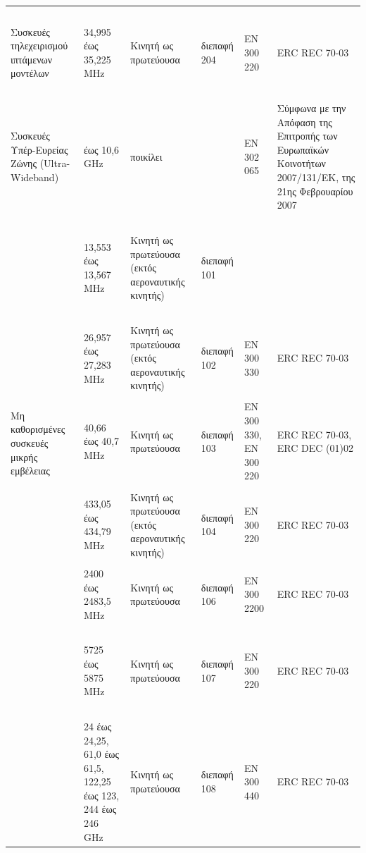 \documentclass[a4paper, 12pt, twoside]{report}
\begin{document}
{{{{{{\begin{landscape}
\begin{longtable} { m{3cm} m{2cm} m{4cm} m{1.5cm} m{2cm} m{4cm} }
					\hdashline
					~\\
					Συσκευές τηλεχειρισμού ιπτάμενων
μοντέλων & 34,995 έως 35,225 MHz & Κινητή ως πρωτεύουσα & διεπαφή 204 & EN 300 220 & ERC REC 70-03\\
					\hdashline
					~\\
					Συσκευές Υπέρ-Ευρείας Ζώνης (Ultra-Wideband) & έως 10,6 GHz & ποικίλει & & EN 302 065 & Σύμφωνα με την Απόφαση της Επιτροπής των Ευρωπαϊκών Κοινοτήτων 2007/131/EK, της 21ης Φεβρουαρίου 2007\\
					\hdashline
					~\\
					& 13,553 έως 13,567 MHz & Κινητή ως πρωτεύουσα (εκτός αεροναυτικής κινητής) & διεπαφή 101 & & \\
					\cline{2-6}
					~\\
				   	\multirow{6}{*}{\parbox{3cm}{Μη καθορισμένες συσκευές μικρής εμβέλειας}}  & 26,957 έως 27,283 MHz & Κινητή ως πρωτεύουσα (εκτός αεροναυτικής κινητής) & διεπαφή 102 & EN 300 330 & ERC REC 70-03\\
				   	\cline{2-6}
					~\\
				   	& 40,66 έως 40,7 MHz & Κινητή ως πρωτεύουσα & διεπαφή 103 & EN 300 330, ΕΝ 300 220 & ERC REC 70-03, ERC DEC (01)02\\
				   	\cline{2-6}
					~\\
				   	& 433,05 έως 434,79 MHz & Κινητή ως πρωτεύουσα (εκτός αεροναυτικής κινητής) & διεπαφή 104 & ΕΝ 300 220 & ERC REC 70-03\\
				   	\cline{2-6}
					~\\
				   	& 2400 έως 2483,5 MHz & Κινητή ως πρωτεύουσα & διεπαφή 106 & ΕΝ 300 2200 & ERC REC 70-03\\
				   	\cline{2-6}
					~\\
				   	& 5725 έως 5875 MHz & Κινητή ως πρωτεύουσα & διεπαφή 107 & ΕΝ 300 220 & ERC REC 70-03\\
				   	\cline{2-6}
					~\\
				   	& 24 έως 24,25, 61,0 έως 61,5, 122,25 έως 123, 244 έως 246 GHz & Κινητή ως πρωτεύουσα & διεπαφή 108 & EN 300 440 & ERC REC 70-03\\
					\hline
			\end{longtable}
			\end{landscape}
				
			\begin{landscape}	
			\setlength\LTleft{0pt}            %
			\setlength\LTright{0pt}           %
			

\end{landscape}}}}}}}
\end{document}
